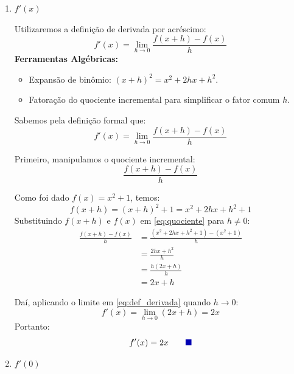 \documentclass[12pt,a4paper]{article}
\newcommand{\qedsymbolmath}{\tag*{\textcolor{blue!70!black}{\rule{1.6ex}{1.6ex}}}}
\begin{document}
\begin{enumerate}
    \renewcommand{\theenumi}{\alph{enumi}}
    \renewcommand{\labelenumi}{\theenumi)}
    \item $f'(x)$
    \begin{recursosbox}[title=Recursos Utilizados]
    Utilizaremos a definição de derivada por acréscimo:
    \[
    f'(x) = \lim_{h \to 0} \frac{f(x + h) - f(x)}{h}
    \]
    \textbf{Ferramentas Algébricas:}
    \begin{itemize}[noitemsep, topsep=2pt]
        \item Expansão de binômio: $(x + h)^2 = x^2 + 2hx + h^2$.
        \item Fatoração do quociente incremental para simplificar o fator comum $h$.
    \end{itemize}
    \end{recursosbox}

    Sabemos pela definição formal que:
    \begin{equation}
        f'(x) = \lim_{h \to 0} \frac{f(x + h) - f(x)}{h} \label{eq:def_derivada}
    \end{equation}

    Primeiro, manipulamos o quociente incremental:
    \begin{equation}
        \frac{f(x + h) - f(x)}{h} \label{eq:quociente}
    \end{equation}

    Como foi dado $f(x) = x^2 + 1$, temos:
    \[
    f(x + h) = (x + h)^2 + 1 = x^2 + 2hx + h^2 + 1
    \]
    Substituindo $f(x + h)$ e $f(x)$ em \eqref{eq:quociente} para $h \neq 0$:
    \begin{align*}
        \frac{f(x + h) - f(x)}{h} &= \frac{(x^2 + 2hx + h^2 + 1) - (x^2 + 1)}{h} \\[0.25cm]
        &= \frac{2hx + h^2}{h} \\[0.25cm]
        &= \frac{h(2x + h)}{h} \\[0.25cm]
        &= 2x + h
    \end{align*}

    Daí, aplicando o limite em \eqref{eq:def_derivada} quando $h \to 0$:
    \[
    f'(x) = \lim_{h \to 0} (2x + h) = 2x
    \]
    Portanto:
    \begin{equation*}
        f'(x) = 2x \qedsymbolmath
    \end{equation*}

    \item $f'(0)$
    \setcounter{equation}{0}


\end{enumerate}
\end{document}
